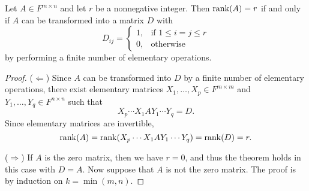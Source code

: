 \begin{theorem}
  \label{thm:rank-finding}
  Let $A \in F^{m \times n}$ and let $r$ be a nonnegative integer.
  Then $\operatorname{rank}(A) = r$ if and only if $A$ can be transformed into a matrix $D$
  with
  \begin{equation*}
    D_{ij} =
    \begin{cases}
      1, & \text{if $1 \leq i = j \leq r$} \\
      0, & \text{otherwise}
    \end{cases}
  \end{equation*}
  by performing a finite number of elementary operations.  
\end{theorem}
\begin{proof}
  ($\Leftarrow$)
  Since $A$ can be transformed into $D$ by a finite number of elementary
  operations, there exist elementary matrices
  $X_1, \dots, X_p \in F^{m \times m}$ and
  $Y_1, \dots, Y_q \in F^{n \times n}$ such that
  \begin{equation*}
    X_p \cdots X_1 A Y_1 \cdots Y_q = D.
  \end{equation*}
  Since elementary matrices are invertible,
  \begin{equation*}
    \operatorname{rank}(A) = \operatorname{rank}(X_p \cdots X_1 A Y_1 \cdots Y_q) = \operatorname{rank}(D) = r.
  \end{equation*}

  ($\Rightarrow$)
  If $A$ is the zero matrix, then we have $r = 0$, and thus the theorem holds
  in this case with $D = A$.
  Now suppose that $A$ is not the zero matrix.
  The proof is by induction on $k = \min(m, n)$.
  

\end{proof}
